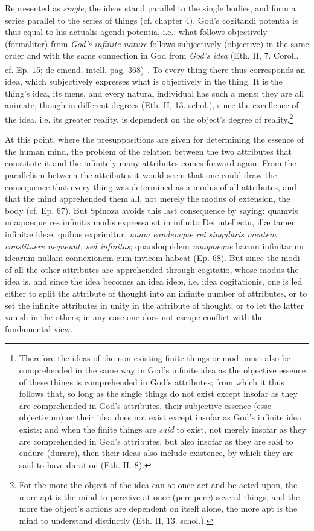 \documentclass[12pt,a4paper,openany]{book}
\newcommand{\opage}[1]{\marginnote{\footnotesize\textit{[#1]}}}
\begin{document}
Represented as \emph{single}, the ideas stand parallel to the
single bodies, and form a series parallel to the series of
things (cf. chapter 4). God's cogitandi potentia is thus equal
to his actualis agendi potentia, i.e.: what follows objectively
(formaliter) from \emph{God's infinite nature} follows
subjectively (objective) in the same order and with the same connection
in God from \emph{God's idea} (Eth. II, 7. Coroll. cf. Ep. 15; de
emend. intell. pag. 368)\footnote{Therefore the ideas of
the non-existing finite things or modi must also be comprehended in the
same way in God's infinite idea as the objective essence of these things
is comprehended in God's attributes; from which it thus follows that,
so long as the single things do not exist except insofar as they
are comprehended in God's attributes, their subjective
essence (esse objectivum) or their idea does not exist except
insofar as God's infinite idea exists; and when the
finite things are \emph{said} to exist, not merely insofar as they
are comprehended in God's attributes, but also insofar as they are said
to endure (durare), then their ideas also include
existence, by which they are said to have duration (Eth. II.
8).}. To
\opage{85}\setcounter{footnote}{0}every thing there thus corresponds an idea, which subjectively expresses
what is objectively in the thing. It is the thing's idea, its
mens, and every natural individual has such a mens; they are
all animate, though in different degrees (Eth. II, 13.
schol.), since the excellence of the idea, i.e. its greater reality, is
dependent on the object's degree of reality.\footnote{For the more
the object of the idea can at once act and be acted upon, the
more apt is the mind to perceive at once
(percipere) several things, and the more the object's actions are
dependent on itself alone, the more apt is the mind
to understand distinctly (Eth. II, 13. schol.).}

At this point, where the presuppositions are given for
determining the essence of the human mind, the problem of
the relation between the two attributes that constitute it and
the infinitely many attributes comes forward again. From the parallelism
between the attributes it would seem that one could draw the
consequence that every thing was determined as a modus of all
attributes, and that the mind apprehended them all, not merely
the modus of extension, the body (cf. Ep. 67). But Spinoza
avoids this last consequence by saying: quamvis
unaquæque res infinitis modis expressa sit in infinito Dei
intellectu, illæ tamen infinitæ ideæ, quibus exprimitur,
\emph{unam eandemque rei singularis mentem constituere
nequeunt, sed infinitas}; quandoquidem \emph{unaquæque} harum
infinitarum idearum nullam connexionem cum invicem habeat
(Ep. 68). But since the modi of all the other attributes are apprehended
through cogitatio, whose modus the idea is, and since the idea becomes
an idea
\opage{86}\setcounter{footnote}{0}ideæ, i.e. idea cogitationis, one is led either to split
the attribute of thought into an infinite number of attributes, or
to set the infinite attributes in unity in the attribute
of thought, or to let the latter vanish in the others; in
any case one does not escape conflict with the fundamental view.
\end{document}
